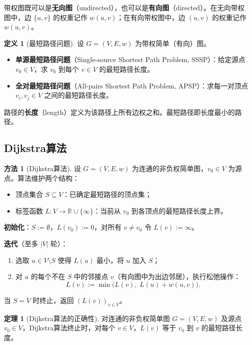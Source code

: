 \documentclass[UTF8,11pt,a4paper]{ctexbook}   %
\theoremstyle{definition}
\newtheorem{definition}{定义}[section]
\newtheorem{theorem}{定理}[section]
\newtheorem{method}{方法}[section]
\begin{document}
带权图既可以是\textbf{无向图}（undirected），也可以是\textbf{有向图}（directed）。在无向带权图中，边 $\{u,v\}$ 的权重记作 $w(u,v)$；在有向带权图中，边 $(u,v)$ 的权重记作 $w(u,v)$。

\begin{definition}[最短路径问题]
设 $G=(V,E,w)$ 为带权简单（有向）图。
\begin{itemize}
    \item \textbf{单源最短路径问题}（Single-source Shortest Path Problem, SSSP）：给定源点 $v_0\in V$，求 $v_0$ 到每个 $v\in V$ 的最短路径长度。
    \item \textbf{全对最短路径问题}（All-pairs Shortest Path Problem, APSP）：求每一对顶点 $v_i,v_j\in V$ 之间的最短路径长度。
\end{itemize}
\end{definition}

路径的\textbf{长度}（length）定义为该路径上所有边权之和。最短路径即长度最小的路径。

\subsection{Dijkstra算法}

\begin{method}[Dijkstra算法]
设 $G=(V,E,w)$ 为连通的非负权简单图，$v_0\in V$ 为源点。算法维护两个结构：
\begin{itemize}
    \item 顶点集合 $S\subseteq V$：已确定最短路径的顶点集；
    \item 标签函数 $L:V\to\mathbb{R}\cup\{\infty\}$：当前从 $v_0$ 到各顶点的最短路径长度上界。
\end{itemize}

\textbf{初始化}：$S:=\emptyset$，$L(v_0):=0$，对所有 $v\neq v_0$ 令 $L(v):=\infty$。

\textbf{迭代}（至多 $|V|$ 轮）：
\begin{enumerate}
    \item 选取 $u\in V\setminus S$ 使得 $L(u)$ 最小，将 $u$ 加入 $S$；
    \item 对 $u$ 的每个不在 $S$ 中的邻接点 $v$（有向图中为出边邻居），执行松弛操作：
    \[
    L(v) := \min\bigl(L(v),\; L(u)+w(u,v)\bigr).
    \]
\end{enumerate}
当 $S=V$ 时终止，返回 $(L(v))_{v\in V}$。
\end{method}

\begin{theorem}[Dijkstra算法的正确性]
对连通的非负权简单图 $G=(V,E,w)$ 及源点 $v_0\in V$，Dijkstra算法终止时，对每个 $v\in V$，$L(v)$ 等于 $v_0$ 到 $v$ 的最短路径长度。
\end{theorem}
\end{document}
